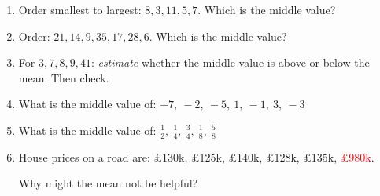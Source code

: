 \documentclass{beamer}
\newcommand{\ashow}[1]{\uncover<2->{\textcolor{red}{\small #1}}}
\begin{document}
\begin{frame}
\begin{columns}[T]
\begin{enumerate}\itemsep1pt
\setcounter{enumi}{4}

  \item Order smallest to largest:
  $8,3,11,5,7$.
  Which is the middle value? \ashow{7}

  \item Order:
  $21,14,9,35,17,28,6$.
  Which is the middle value? \ashow{17}

  \item For $3,7,8,9,41$:
  \textit{estimate} whether the middle value is above or below the mean.
  Then check. \ashow{below: median $8$, mean $13.6$}

  \item What is the middle value of:
  $-7,\ -2,\ -5,\ 1,\ -1,\ 3,\ -3$ \ashow{$-2$}

  \item What is the middle value of:
  $\tfrac{1}{2},\ \tfrac{1}{4},\ \tfrac{3}{4},\ \tfrac{1}{8},\ \tfrac{5}{8}$ \ashow{$\frac{1}{2}$}

  \item House prices on a road are:
  \pounds130k,
  \pounds125k,
  \pounds140k,
  \pounds128k,
  \pounds135k,
  \textcolor{red}{\pounds980k}.

  Why might the mean not be helpful? \ashow{the \pounds980k outlier pulls the mean up}

\end{enumerate}

\end{columns}

\end{frame}
\end{document}
